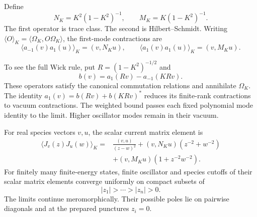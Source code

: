 Define
\[
 N_K=K^2(1-K^2)^{-1},\qquad
 M_K=K(1-K^2)^{-1}.
\]
The first operator is trace class. The second
is Hilbert--Schmidt. Writing
\(\langle O\rangle_K=\langle\Omega_K,O\Omega_K\rangle\),
the first-mode contractions are
\[
 \langle a_{-1}(v)a_1(u)\rangle_K=(v,N_Ku),
 \qquad
 \langle a_1(v)a_1(u)\rangle_K=(v,M_Ku).
\]

To see the full Wick rule, put
\(R=(1-K^2)^{-1/2}\) and
\[
             b(v)=a_1(Rv)-a_{-1}(KRv).
\]
These operators satisfy the canonical commutation
relations and annihilate \(\Omega_K\).
The identity
\(a_1(v)=b(Rv)+b(KRv)^*\) reduces its
finite-rank contractions to vacuum contractions.
The weighted bound passes each fixed polynomial
mode identity to the limit. Higher oscillator
modes remain in their vacuum.

\begin{theorem}\label{v4-thm:singular-prepared-fields}
For real species vectors \(v,u\), the scalar
current matrix element is
\begin{equation}\label{v4-eq:singular-prepared-current}
 \begin{aligned}
 \langle J_v(z)J_u(w)\rangle_K
   ={}&\frac{(v,u)}{(z-w)^2}
        +(v,N_Ku)(z^{-2}+w^{-2})\\
      &+(v,M_Ku)(1+z^{-2}w^{-2}).
 \end{aligned}
\end{equation}
For finitely many finite-energy states,
finite oscillator and species cutoffs of
their scalar matrix elements converge uniformly
on compact subsets of
\[
                         |z_1|>\cdots>|z_n|>0.
\]
The limits continue meromorphically.
Their possible poles lie on pairwise
diagonals and at the prepared punctures \(z_i=0\).
\end{theorem}

